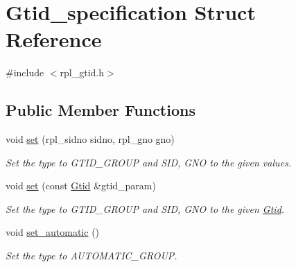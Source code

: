 \hypertarget{structGtid__specification}{}\section{Gtid\+\_\+specification Struct Reference}
\label{structGtid__specification}


{\ttfamily \#include $<$rpl\+\_\+gtid.\+h$>$}

\subsection*{Public Member Functions}
\begin{DoxyCompactItemize}
\item 
\mbox{\label{structGtid__specification_ad0a45a963218a0865e720d9aa7e46932}} 
void \mbox{\hyperlink{structGtid__specification_ad0a45a963218a0865e720d9aa7e46932}{set}} (rpl\+\_\+sidno sidno, rpl\+\_\+gno gno)
\begin{DoxyCompactList}\small\item\em Set the type to G\+T\+I\+D\+\_\+\+G\+R\+O\+UP and S\+ID, G\+NO to the given values. \end{DoxyCompactList}\item 
\mbox{\label{structGtid__specification_aa3c1d2f7da7b8c5c2aee1a9375cad7b1}} 
void \mbox{\hyperlink{structGtid__specification_aa3c1d2f7da7b8c5c2aee1a9375cad7b1}{set}} (const \mbox{\hyperlink{structGtid}{Gtid}} \&gtid\+\_\+param)
\begin{DoxyCompactList}\small\item\em Set the type to G\+T\+I\+D\+\_\+\+G\+R\+O\+UP and S\+ID, G\+NO to the given \mbox{\hyperlink{structGtid}{Gtid}}. \end{DoxyCompactList}\item 
\mbox{\label{structGtid__specification_acd45912a724778e6f3539cb5abe311dd}} 
void \mbox{\hyperlink{structGtid__specification_acd45912a724778e6f3539cb5abe311dd}{set\+\_\+automatic}} ()
\begin{DoxyCompactList}\small\item\em Set the type to A\+U\+T\+O\+M\+A\+T\+I\+C\+\_\+\+G\+R\+O\+UP. \end{DoxyCompactList}\item 
\mbox{\label{structGtid__specification_abbccfa0e057200ab56af5887ca967976}} 

\end{DoxyCompactItemize}
